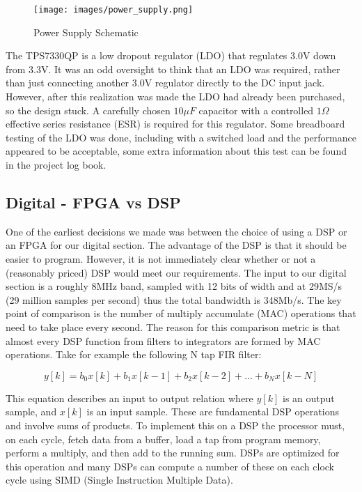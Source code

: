 \documentclass[a4paper, 12pt, notitlepage]{article}
\begin{document}

\begin{figure}
  \texttt{[image: images/power\_supply.png]}
  \caption{Power Supply Schematic}
  \label{fig:power_supply}
\end{figure}

The TPS7330QP is a low dropout regulator (LDO) that regulates 3.0V down from 3.3V.  It was an odd oversight to think that an LDO was required, rather than just connecting another 3.0V regulator directly to the DC input jack.  However, after this realization was made the LDO had already been purchased, so the design stuck.  A carefully chosen $10\mu F$ capacitor with a controlled $1\Omega$ effective series resistance (ESR) is required for this regulator.  Some breadboard testing of the LDO was done, including with a switched load and the performance appeared to be acceptable, some extra information about this test can be found in the project log book.


\subsection{Digital - FPGA vs DSP}
One of the earliest decisions we made was between the choice of using a DSP or an FPGA for our digital section.  The advantage of the DSP is that it should be easier to program.  However, it is not immediately clear whether or not a (reasonably priced) DSP would meet our requirements.  The input to our digital section is a roughly 8MHz band, sampled with 12 bits of width and at 29MS/s (29 million samples per second) thus the total bandwidth is 348Mb/s.  The key point of comparison is the number of multiply accumulate (MAC) operations that need to take place every second.  The reason for this comparison metric is that almost every DSP function from filters to integrators are formed by MAC operations.  Take for example the following N tap FIR filter:

\begin{equation}
  y[k] = b_0x[k] + b_1x[k - 1] + b_2x[k - 2] + ... + b_Nx[k - N]
\end{equation}

This equation describes an input to output relation where $y[k]$ is an output sample, and $x[k]$ is an input sample.  These are fundamental DSP operations and involve sums of products.  To implement this on a DSP the processor must, on each cycle, fetch data from a buffer, load a tap from program memory, perform a multiply, and then add to the running sum.  DSPs are optimized for this operation and many DSPs can compute a number of these on each clock cycle using SIMD (Single Instruction Multiple Data).
\end{document}
